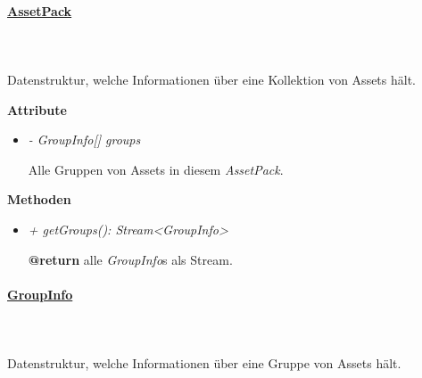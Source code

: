     \paragraph{\underline{AssetPack}} \mbox{}\\
    \\
        Datenstruktur, welche Informationen über eine Kollektion von Assets hält.\par

        \textbf{Attribute}
        \begin{itemize}
            \item \textit{- GroupInfo[] groups}
                \begin{leftbar}[0.9\linewidth]
                    Alle Gruppen von Assets in diesem \textit{AssetPack}.
                \end{leftbar}
        \end{itemize}
        \textbf{Methoden}
        \begin{itemize}
            \item \textit{+ getGroups(): Stream<GroupInfo>}
                \begin{leftbar}[0.9\linewidth]
                   \textbf{@return} alle \textit{GroupInfo}s als Stream.
                \end{leftbar}
        \end{itemize}

    \paragraph{\underline{GroupInfo}} \mbox{}\\
    \\
        Datenstruktur, welche Informationen über eine Gruppe von Assets hält.\par

